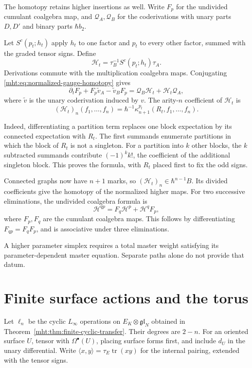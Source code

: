 The homotopy retains higher insertions as well. Write $F_p$ for the
undivided cumulant coalgebra map, and $\mathcal Q_A,\mathcal Q_B$
for the coderivations with unary parts $D,D'$ and binary parts
$\hbar b_2$.

Let $S^c(p_t;h_t)$ apply $h_t$ to one factor and $p_t$ to every
other factor, summed with the graded tensor signs. Define
\[
 \mathcal H_t=\tau_B^{-1}S^c(p_t;h_t)\tau_A.
\]
Derivations commute with the multiplication coalgebra maps.
Conjugating
\eqref{mht:eq:normalized-gauge-homotopy} gives
\[
 \partial_tF_p+F_p\widetilde v_A-\widetilde v_BF_p
       =\mathcal Q_B\mathcal H_t+\mathcal H_t\mathcal Q_A,
\]
where $\widetilde v$ is the unary coderivation induced by $v$.
The arity-$n$ coefficient of $\mathcal H_t$ is
\begin{equation}\label{mht:eq:marked-quantum-homotopy}
 (\mathcal H_t)_n(f_1,\ldots,f_n)
        =\hbar^{-1}\kappa_{n+1}^{p_t}(R_t,f_1,\ldots,f_n).
\end{equation}

Indeed, differentiating a partition term replaces one block
expectation by its connected expectation with $R_t$. The first
summands enumerate partitions in which the block of $R_t$ is not
a singleton. For a partition into $k$ other blocks, the $k$
subtracted summands contribute $(-1)^k k!$, the coefficient of
the additional singleton block. This proves the formula, with
$R_t$ placed first to fix the odd signs.

Connected graphs now have $n+1$ marks, so
$(\mathcal H_t)_n\in\hbar^{n-1}B$. Its divided coefficients give
the homotopy of the normalized higher maps. For two successive
eliminations, the undivided coalgebra formula is
\[
 \mathcal H^{qp}=F_q\mathcal H^p+\mathcal H^qF_p,
\]
where $F_p,F_q$ are the cumulant coalgebra maps. This follows by
differentiating $F_{qp}=F_qF_p$, and is associative under three
eliminations.

A higher parameter simplex requires a total master weight satisfying
its parameter-dependent master equation. Separate paths alone do not
provide that datum.

\section{Finite surface actions and the torus}

Let $\ell_n$ be the cyclic $L_\infty$ operations on
$E_K\otimes\mathfrak{gl}_N$ obtained in
Theorem~\ref{mht:thm:finite-cyclic-transfer}. Their degrees are $2-n$.
For an oriented surface $U$, tensor with $\Omega^\bullet(U)$,
placing surface forms first, and include $d_U$ in the unary
differential. Write $\langle x,y\rangle=\tau_E\operatorname{tr}(xy)$
for the internal pairing, extended with the tensor signs.

